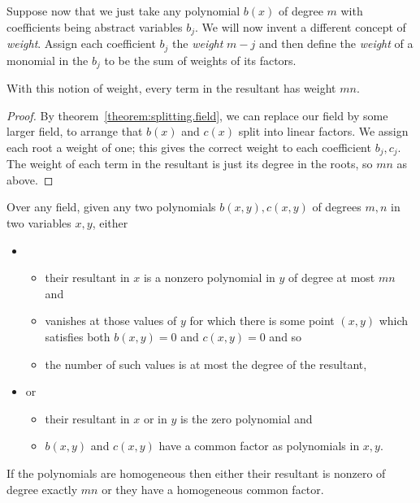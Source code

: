 Suppose now that we just take any polynomial \(b(x)\) of degree \(m\) with coefficients being abstract variables \(b_j\). 
We will now invent a different concept of \emph{weight}.
Assign each coefficient \(b_j\) the \emph{weight} \(m-j\) and then define the \emph{weight} of a monomial in the \(b_j\) to be  the sum of weights of its factors.
\begin{lemma}
With this notion of weight, every term in the resultant has weight \(mn\).
\end{lemma}
\begin{proof}
By theorem~\vref{theorem:splitting.field}, we can replace our field by some larger field, to arrange that \(b(x)\) and \(c(x)\) split into linear factors.
We assign each root a weight of one; this gives the correct weight to each coefficient \(b_j,c_j\).
The weight of each term in the resultant is just its degree in the roots, so \(mn\) as above.
\end{proof}
\begin{proposition}\label{proposition:resultant.degree}
Over any field, given any two polynomials \(b(x,y),c(x,y)\) of degrees \(m,n\) in two variables \(x,y\), either 
\begin{itemize}
\item
\begin{itemize}
\item
their resultant in \(x\) is a nonzero polynomial in \(y\) of degree at most \(mn\) and 
\item
vanishes at those values of \(y\) for which there is some point \((x,y)\) which satisfies both \(b(x,y)=0\) and \(c(x,y)=0\) and so
\item
the number of such values is at most the degree of the resultant,
\end{itemize}
\item
or 
\begin{itemize}
\item
their resultant in \(x\) or in \(y\) is the zero polynomial and
\item
\(b(x,y)\) and \(c(x,y)\) have a common factor as polynomials in \(x,y\).
\end{itemize}
\end{itemize}
If the polynomials are homogeneous then either their resultant is nonzero of degree exactly \(mn\) or they have a homogeneous common factor.
\end{proposition}
